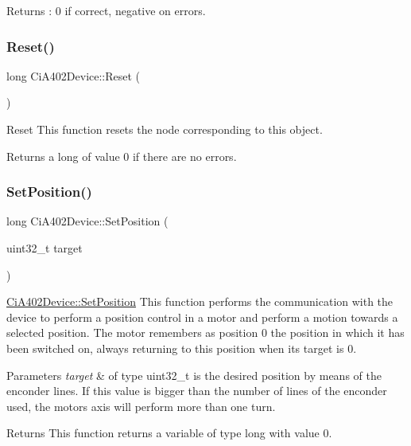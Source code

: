 \begin{DoxyReturn}{Returns}
\+: 0 if correct, negative on errors. 
\end{DoxyReturn}
\mbox{\label{classCiA402Device_ac4a6e4987ebe075d0ac07ee5fd4d410c}} 
\subsubsection{\texorpdfstring{Reset()}{Reset()}}
{\footnotesize\ttfamily long Ci\+A402\+Device\+::\+Reset (\begin{DoxyParamCaption}{ }\end{DoxyParamCaption})}



Reset This function resets the node corresponding to this object. 

\begin{DoxyReturn}{Returns}
a long of value 0 if there are no errors. 
\end{DoxyReturn}
\mbox{\label{classCiA402Device_acb2d6cc96a8a613f9c2791e87344ba0d}} 
\subsubsection{\texorpdfstring{Set\+Position()}{SetPosition()}}
{\footnotesize\ttfamily long Ci\+A402\+Device\+::\+Set\+Position (\begin{DoxyParamCaption}\item[{uint32\+\_\+t}]{target }\end{DoxyParamCaption})}



\hyperlink{classCiA402Device_acb2d6cc96a8a613f9c2791e87344ba0d}{Ci\+A402\+Device\+::\+Set\+Position} This function performs the communication with the device to perform a position control in a motor and perform a motion towards a selected position. The motor remembers as position 0 the position in which it has been switched on, always returning to this position when its target is 0. 


\begin{DoxyParams}{Parameters}
{\em target} & of type uint32\+\_\+t is the desired position by means of the enconder lines. If this value is bigger than the number of lines of the enconder used, the motor\textquotesingle{}s axis will perform more than one turn. \\
\hline
\end{DoxyParams}
\begin{DoxyReturn}{Returns}
This function returns a variable of type long with value 0. 
\end{DoxyReturn}
\mbox{\label{classCiA402Device_a97acf47b3e3751c85fa70091d3bdfa6a}} 
